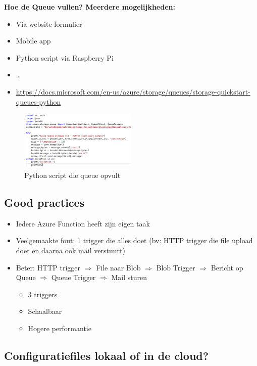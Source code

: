 \documentclass{article}
\newcommand{\bold}[1]{\textbf{#1}}
\begin{document}
\bold{Hoe de Queue vullen? Meerdere mogelijkheden: }

\begin{itemize}
    \item Via website formulier
    \item Mobile app
    \item Python script via Raspberry Pi
    \item \dots
    \item \url{https://docs.microsoft.com/en-us/azure/storage/queues/storage-quickstart-queues-python}
\end{itemize}

\begin{figure}[H]
    \centering
    \includegraphics[width=0.5\textwidth]{scenario-3-3.png}
    \caption{Python script die queue opvult}
\end{figure}

\subsection{Good practices}

\begin{itemize}
    \item Iedere Azure Function heeft zijn eigen taak
    \item Veelgemaakte fout: 1 trigger die alles doet (bv: HTTP trigger die file upload doet en daarna ook mail verstuurt)
    \item Beter: HTTP trigger $\Rightarrow$ File naar Blob $\Rightarrow$ Blob Trigger $\Rightarrow$ Bericht op Queue $\Rightarrow$ Queue Trigger $\Rightarrow$ Mail sturen
    \begin{itemize}
        \item 3 triggers
        \item Schaalbaar
        \item Hogere performantie
    \end{itemize}
\end{itemize}

\subsection{Configuratiefiles lokaal of in de cloud?}
\end{document}

